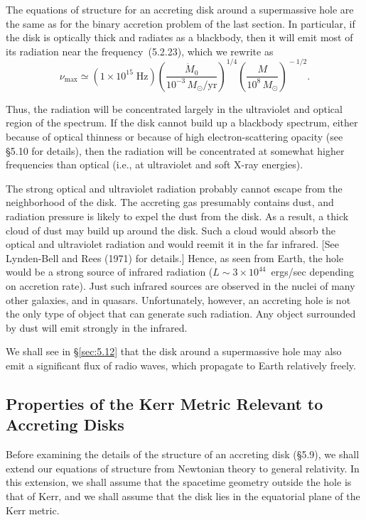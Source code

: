The equations of structure for an accreting disk around a supermassive hole
are the same as for the binary accretion problem of
the last section.  In particular, if the disk is optically thick and radiates as a
blackbody, then it will emit most of its radiation near the frequency~(5.2.23),
which we rewrite as
\begin{equation}
\nu_{\max} \simeq (1 \times 10^{15}\;\text{Hz})
\left(\frac{\dot{M}_0}{10^{-3}\,M_\odot/\text{yr}}\right)^{1/4}
\!\left(\frac{M}{10^8\,M_\odot}\right)^{\!-1/2}.
\tag{5.3.1}
\end{equation}

Thus, the radiation will be concentrated largely in the ultraviolet and optical
region of the spectrum.  If the disk cannot build up a blackbody spectrum, either
because of optical thinness or because of high electron-scattering opacity (see
\S5.10 for details), then the radiation will be concentrated at somewhat higher
frequencies than optical (i.e., at ultraviolet and soft X-ray energies).

The strong optical and ultraviolet radiation probably cannot escape from the neighborhood
of the disk.  The accreting gas presumably contains dust, and radiation pressure
is likely to expel the dust from the disk.  As a result, a thick cloud of dust may
build up around the disk.  Such a cloud would absorb the optical and ultraviolet
radiation and would reemit it in the far infrared.  [See Lynden-Bell and Rees
(1971) for details.]  Hence, as seen from Earth, the hole would be a strong source
of infrared radiation ($L \sim 3 \times 10^{44}$~ergs/sec depending on accretion rate).
Just such infrared sources are observed in the nuclei of many other galaxies, and in quasars.
Unfortunately, however, an accreting hole is not the only type of object that
can generate such radiation.  Any object surrounded by dust will emit strongly in the infrared.

We shall see in \S\ref{sec:5.12} that the disk around a supermassive hole may also emit
a significant flux of radio waves, which propagate to Earth relatively freely.

\subsection{Properties of the Kerr Metric Relevant to Accreting Disks}
\label{sec:5.4}

Before examining the details of the structure of an accreting disk (\S5.9),
we shall extend our equations of structure from Newtonian theory to general
relativity.  In this extension, we shall assume that the spacetime geometry
outside the hole is that of Kerr, and we shall assume that the disk lies in the
equatorial plane of the Kerr metric.

